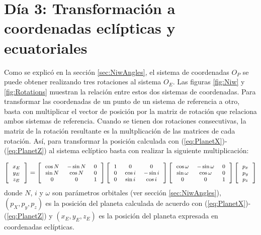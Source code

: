 \documentclass[a4paper,10pt]{article}
\begin{document}
\section{Día 3: Transformación a coordenadas eclípticas y ecuatoriales}
Como se explicó en la sección \ref{sec:NiwAngles}, el sistema de coordenadas $O_P$ se puede obtener realizando tres rotaciones al sistema $O_E$. Las figuras \ref{fig:Niw} y \ref{fig:Rotations} muestran la relación entre estos dos sistemas de coordenadas. Para transformar las coordenadas de un punto de un sistema de referencia a otro, basta con multiplicar el vector de posición por la matriz de rotación que relaciona ambos sistemas de referencia. Cuando se tienen dos rotaciones consecutivas, la matriz de la rotación resultante es la multplicación de las matrices de cada rotación. Así, para transformar la posición calculada con (\ref{eq:PlanetX})-(\ref{eq:PlanetZ}) al sistema eclíptico basta con realizar la siguiente multiplicación:

\begin{equation}
  \footnotesize
  \left[ \begin{tabular}{c} $x_E$\\$y_E$\\$z_E$\end{tabular}\right] =
  \left[ \begin{tabular}{ccc}
           $\cos N$ & $-\sin N$ & 0 \\
           $\sin N$ & $ \cos N$ & 0 \\
           $0$      & $0$       & 1
         \end{tabular}\right]
  \left[ \begin{tabular}{ccc}
           $1$      & $0$       & $0$ \\
           $0$      & $\cos i$ & $-\sin i$ \\
           $0$      & $\sin i$ & $ \cos i$
         \end{tabular}\right]
  \left[ \begin{tabular}{ccc}
           $\cos \omega$ & $-\sin \omega$ & 0 \\
           $\sin \omega$ & $ \cos \omega$ & 0 \\
           $0$      & $0$       & 1
         \end{tabular}\right]
  \left[ \begin{tabular}{c} $p_x$\\$p_y$\\$p_z$\end{tabular}\right]
\end{equation}
donde $N$, $i$ y $\omega$ son  parámetros orbitales (ver sección \ref{sec:NiwAngles}), $(p_X, p_y, p_z)$ es la posición del planeta calculada de acuerdo con (\ref{eq:PlanetX})-(\ref{eq:PlanetZ}) y $(x_E, y_E, z_E)$ es la posición del planeta expresada en coordenadas eclípticas.
\end{document}
